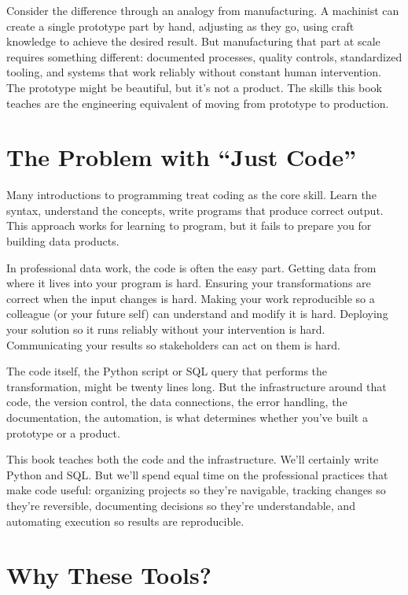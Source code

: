 \documentclass[
  letterpaper,
  DIV=11,
  numbers=noendperiod]{scrreprt}
\begin{document}
Consider the difference through an analogy from manufacturing. A
machinist can create a single prototype part by hand, adjusting as they
go, using craft knowledge to achieve the desired result. But
manufacturing that part at scale requires something different:
documented processes, quality controls, standardized tooling, and
systems that work reliably without constant human intervention. The
prototype might be beautiful, but it's not a product. The skills this
book teaches are the engineering equivalent of moving from prototype to
production.

\section*{The Problem with ``Just
Code''}\label{the-problem-with-just-code}


Many introductions to programming treat coding as the core skill. Learn
the syntax, understand the concepts, write programs that produce correct
output. This approach works for learning to program, but it fails to
prepare you for building data products.

In professional data work, the code is often the easy part. Getting data
from where it lives into your program is hard. Ensuring your
transformations are correct when the input changes is hard. Making your
work reproducible so a colleague (or your future self) can understand
and modify it is hard. Deploying your solution so it runs reliably
without your intervention is hard. Communicating your results so
stakeholders can act on them is hard.

The code itself, the Python script or SQL query that performs the
transformation, might be twenty lines long. But the infrastructure
around that code, the version control, the data connections, the error
handling, the documentation, the automation, is what determines whether
you've built a prototype or a product.

This book teaches both the code and the infrastructure. We'll certainly
write Python and SQL. But we'll spend equal time on the professional
practices that make code useful: organizing projects so they're
navigable, tracking changes so they're reversible, documenting decisions
so they're understandable, and automating execution so results are
reproducible.

\section*{Why These Tools?}\label{why-these-tools}
\end{document}
